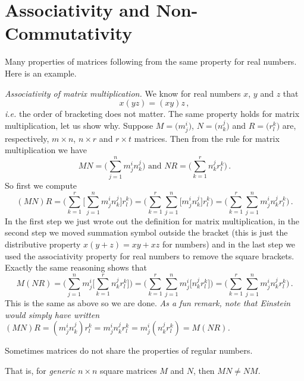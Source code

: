 \section{Associativity and Non-Commutativity }

Many properties of matrices following from the same property for real numbers. Here is an example.

\begin{example}
{\it Associativity of matrix multiplication.} We know for real numbers $x$, $y$ and $z$ that 
\[
x(yz)=(xy)z\, ,
\]
{\it i.e.} the order of bracketing does not matter. The same property holds for matrix multiplication, let us show why.
Suppose $M=\big( m^i_j \big)$, $N=\big( n^j_k \big)$ and  $R=\big( r^k_l \big)$ are, 
respectively, $m\times n$, $n\times r$ and $r\times t$ matrices. Then from the rule for matrix
multiplication we have
\[
MN=\Big(\sum_{j=1}^n m^i_j n^j_k\Big)\mbox{ and } NR=\Big(\sum_{k=1}^r n^j_k r^k_l\Big)\, .
\]
So first we compute 
\[
(MN)R=\Big(\sum_{k=1}^r \Big[\sum_{j=1}^n m^i_j n^j_k\Big] r^k_l \Big) = 
\Big(\sum_{k=1}^r \sum_{j=1}^n \Big[ m^i_j n^j_k\Big] r^k_l \Big) =\Big(\sum_{k=1}^r \sum_{j=1}^n m^i_j n^j_k r^k_l \Big)\, .
\]
In the first step we just wrote out the definition for matrix multiplication, in the second step we
moved summation symbol outside the bracket (this is just the distributive
property $x(y+z)=xy+xz$ for numbers) and
in the last step we used the associativity property for real numbers to remove the square brackets. 
Exactly the same reasoning shows that
\[
M(NR)=\Big(\sum_{j=1}^n m^i_j\Big[\sum_{k=1}^r n^j_k r^k_l\Big]\Big) = 
\Big(\sum_{k=1}^r \sum_{j=1}^n  m^i_j \Big[n^j_kr^k_l \Big] \Big) =\Big(\sum_{k=1}^r \sum_{j=1}^n m^i_j n^j_k r^k_l \Big)\, .
\]
This is the same as above so we are done. {\it As a fun remark, note that Einstein would simply have written
$(MN)R=(m^i_j n^j_k) r^k_l= m^i_j n^j_k r^k_l = m^i_j (n^j_k r^k_l ) = M(NR)$.}
\end{example}


Sometimes matrices do not share the properties of regular numbers. 


That is, for {\it generic} $n\times n$ square matrices $M$ and $N$, then $MN\neq NM$. 

